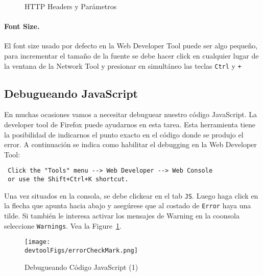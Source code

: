 \begin{figure}[htb]
 \centering
 \caption{HTTP Headers y Parámetros}
\end{figure}


\paragraph{Font Size.} El font size usado por defecto en la Web Developer Tool puede ser algo pequeño, para incrementar el tamaño de la fuente se debe hacer click en cualquier lugar de la ventana de la Network Tool y presionar en simultáneo las teclas \texttt{Ctrl} y \texttt{+} 



\subsection{Debugueando JavaScript}
\label{web:sec:jsdebugging}

En muchas ocasiones vamos a necesitar debuguear nuestro código JavaScript. La developer tool de Firefox puede ayudarnos en esta tarea. Esta herramienta tiene la posibilidad de indicarnos el punto exacto en el código donde se produjo el error. A continuación se indica como habilitar el debugging en la Web Developer Tool:

\begin{lstlisting}
 Click the "Tools" menu --> Web Developer --> Web Console
 or use the Shift+Ctrl+K shortcut.
\end{lstlisting}

Una vez situados en la consola, se debe clickear en el tab {\tt JS}. Luego haga click en la flecha que apunta hacia abajo y asegúrese que al costado de {\tt Error} haya una tilde. Si también le interesa activar los mensajes de Warning en la coonsola seleccione {\tt Warnings}. Vea la Figure~\ref{devtool:fig:errocheckmark}.

\begin{figure}[htb]
\begin{center}
  \texttt{[image: \\devtoolFigs/errorCheckMark.png]}
\end{center}
\caption{Debugueando Código JavaScript (1)}
\label{devtool:fig:errocheckmark}
\end{figure}
 
